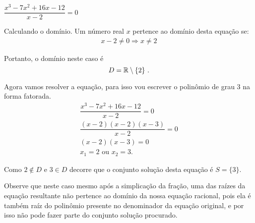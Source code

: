  
 
  \begin{exem} $\dfrac{x^3 - 7x^2 + 16x -12}{x-2}=0 $
 
 Calculando o domínio. Um número real $x$ pertence ao domínio desta equação se:
 \begin{eqnarray*}
  x - 2 \neq 0  \Rightarrow x \neq 2
 \end{eqnarray*}
 
 Portanto, o domínio neste caso é
 \[D= \mathbb{R} \setminus \{2\} \ . \]
 
 Agora vamos resolver a equação, para isso vou escrever o polinômio de grau 3 na forma fatorada.
 \begin{eqnarray*}
 \dfrac{x^3 - 7x^2 + 16x -12}{x-2}=0 \\
 \dfrac{(x-2)(x-2)(x-3)}{x -2}=0 \\
 (x-2)(x-3)=0 \\
 x_1= 2 \text{ ou } x_2= 3.
 \end{eqnarray*}
 
 Como $2 \notin D$ e $3 \in D$ decorre que o conjunto solução desta equação é $S= \{ 3 \}$.
 
 Observe que neste caso mesmo após a simplicação da fração, uma das raízes da equação resultante não pertence ao domínio da nossa equação racional, pois ela é também raíz do polinômio presente no denominador da equação original, e por isso não pode fazer parte do conjunto solução procurado.
 \end{exem}


\newpage

